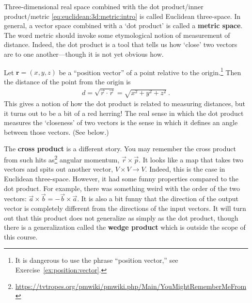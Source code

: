 Three-dimensional real space combined with the dot product/inner product/metric \eqref{eq:euclidean:3d:metric:intro} is called Euclidean three-space. In general, a vector space combined with a `dot product' is called a \textbf{metric space}. The word metric should invoke some etymological notion of measurement of distance. Indeed, the dot product is a tool that tells us how `close' two vectors are to one another---though it is not yet obvious how.

\begin{example}
Let $\mathbf{r}=(x,y,z)$ be a ``position vector'' of a point relative to the origin.\footnote{It is dangerous to use the phrase ``position vector,'' see Exercise~\ref{ex:position:vector}.} Then the distance of the point from the origin is
\begin{align}
    d = \sqrt{\vec{r}\cdot\vec{r}} =
    \sqrt{x^2+y^2 +z^2} \ .
    \label{eq:distance:in:space}
\end{align}
This gives a notion of how the dot product is related to measuring distances, but it turns out to be a bit of a red herring! The real sense in which the dot product measures the `closeness' of two vectors is the sense in which it defines an angle between those vectors. (See below.)
\end{example}


The \textbf{cross product} is a different story. You may remember the cross product from such hits as\footnote{\url{https://tvtropes.org/pmwiki/pmwiki.php/Main/YouMightRememberMeFrom}} angular momentum, $\vec{r}\times\vec{p}$. It looks like a map that takes two vectors and spits out another vector, $V\times V \to V$. Indeed, this is the case in Euclidean three-space. However, it had some funny properties compared to the dot product. For example, there was something weird with the order of the two vectors: $\vec{a}\times \vec{b}  = - \vec{b}\times \vec{a}$. It is also a bit funny that the direction of the output vector is completely different from the directions of the input vectors. It will turn out that this product does not generalize as simply as the dot product, though there is a generalization called the \textbf{wedge product} which is outside the scope of this course.

